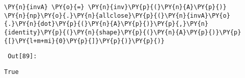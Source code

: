 {\par%
\vspace{-1\baselineskip}%
}%
\begin{notebookcell}[89]%
\begin{addmargin}[\cellleftmargin]{0em}%
{\smaller%
\par%
%
\vspace{-1\smallerfontscale}%
\begin{Verbatim}[commandchars=\\\{\}]
\PY{n}{invA} \PY{o}{=} \PY{n}{inv}\PY{p}{(}\PY{n}{A}\PY{p}{)}
\PY{n}{np}\PY{o}{.}\PY{n}{allclose}\PY{p}{(}\PY{n}{invA}\PY{o}{.}\PY{n}{dot}\PY{p}{(}\PY{n}{A}\PY{p}{)}\PY{p}{,}\PY{n}{identity}\PY{p}{(}\PY{n}{shape}\PY{p}{(}\PY{n}{A}\PY{p}{)}\PY{p}{[}\PY{l+m+mi}{0}\PY{p}{]}\PY{p}{)}\PY{p}{)}
\end{Verbatim}
%
\par%
\vspace{-1\smallerfontscale}}%
\end{addmargin}
\end{notebookcell}

\par\vspace{1\smallerfontscale}%
    
        {\par%
        \vspace{-1\smallerfontscale}%
        \noindent%
        \begin{minipage}{\cellleftmargin}%
    \hfill%
    {\smaller%
    \tt%
    \color{nbframe-out-prompt}%
    Out[89]:}%
    \hspace{\inputpadding}%
    \hspace{0em}%
    \hspace{3pt}%
    \end{minipage}%
        }%
    \begin{addmargin}[\cellleftmargin]{0em}%
    {\smaller%
    \vspace{-1\smallerfontscale}%
    
    
    
    \begin{verbatim}
True
    \end{verbatim}

    
}%
    \end{addmargin}%

